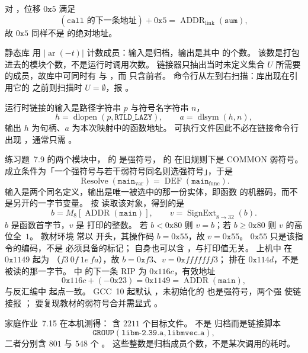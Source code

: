 对 ，位移 $0\texttt{x}5$ 满足
\[
(\texttt{call 的下一条地址})+0\texttt{x}5=\operatorname{ADDR}_{\mathrm{link}}(\texttt{sum}),
\]
故 $0\texttt{x}5$ 同样不是  的绝对地址。

静态库  用 $\lvert\operatorname{ar}(-t)\rvert$ 计数成员：输入是归档，输出是其中  的个数。
该数是打包进去的模块个数，不是运行时调用次数。
链接器只抽出当时未定义集合 $U$ 所需要的成员，故库中可同时有  与 ，而  只含前者。
命令行从左到右扫描：库出现在引用它的  之前则扫描时 $U=\emptyset$，报 。

运行时链接的输入是路径字符串 $p$ 与符号名字符串 $n$，
\[
h=\operatorname{dlopen}(p,\texttt{RTLD\_LAZY}),
\qquad
a=\operatorname{dlsym}(h,n),
\]
输出 $h$ 为句柄、$a$ 为本次映射中的函数地址。
可执行文件因此不必在链接命令行出现 ，通常只需 。

练习题~7.9 的两个模块中， 的  是强符号， 的  在旧规则下是 COMMON 弱符号。
成立条件为「一个强符号与若干弱符号同名则选强符号」，于是
\[
\operatorname{Resolve}(\texttt{main}_{\mathrm{var}})=\operatorname{DEF}(\texttt{main}_{\mathrm{func}}).
\]
输入是两个同名定义，输出是唯一被选中的那一份实体，即函数  的机器码，而不是另开的一字节变量。
 按  读取该对象，得到的是
\[
b=M_{8}[\operatorname{ADDR}(\texttt{main})],
\qquad
v=\operatorname{SignExt}_{8\to 32}(b).
\]
$b$ 是函数首字节，$v$ 是  打印的整数。
若 $b<0\texttt{x}80$ 则 $v=b$；若 $b\ge 0\texttt{x}80$ 则 $v$ 的高位全~$1$。
教材环境  常以  开头，其操作码 $b=0\texttt{x}55$，故 $v=0\texttt{x}55$。
$0\texttt{x}55$ 只是该指令的编码，不是  必须具备的标记； 自身也可以含 ，与打印值无关。
上机中  在 $0\texttt{x}1149$ 起为 （$f3\ 0f\ 1e\ fa$），故 $b=0\texttt{x}f3$、$v=0\texttt{x}fffffff3$；
 排在 $0\texttt{x}114d$，不是被读的那一字节。
 中  的下一条 RIP 为 $0\texttt{x}116c$，有效地址
\[
0\texttt{x}116c+(-0\texttt{x}23)=0\texttt{x}1149=\operatorname{ADDR}(\texttt{main}),
\]
与反汇编中  起点一致。
GCC~10 起默认 ，未初始化的  也是强符号，两个强  使链接报 ；
要复现教材的弱符号合并需显式 。

家庭作业~7.15 在本机测得： 含 $2211$ 个目标文件。
 不是  归档而是链接脚本
\[
\texttt{GROUP}(\texttt{libm-2.39.a},\texttt{libmvec.a}),
\]
二者分别含 $801$ 与 $548$ 个 。
这些整数是归档成员个数，不是某次调用的耗时。

